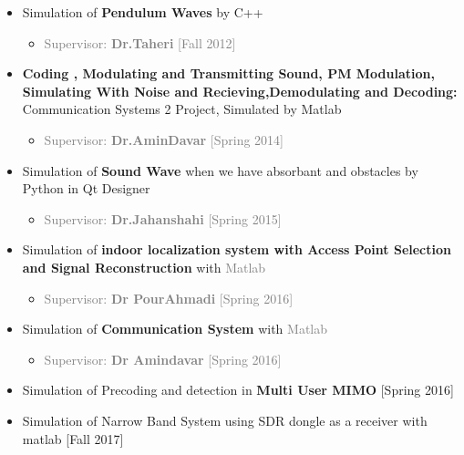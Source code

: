 \documentclass[10pt,a4paper,sans]{moderncv} %
\begin{document}
\begin{itemize}
\item Simulation of \textbf{Pendulum Waves} by C++
\begin{itemize}
\item \textcolor{gray}{Supervisor: \textbf{Dr.Taheri} [Fall 2012]}
\end{itemize}

\item \textbf{Coding , Modulating and Transmitting Sound, PM Modulation, Simulating With Noise and Recieving,Demodulating and Decoding:} Communication Systems 2 Project, Simulated by Matlab 
\begin{itemize}
\item \textcolor{gray}{Supervisor: \textbf{Dr.AminDavar} [Spring 2014]}
\end{itemize}

\item Simulation of \textbf{Sound Wave} when we have absorbant and obstacles by Python in Qt Designer
\begin{itemize}
\item \textcolor{gray}{Supervisor: \textbf{Dr.Jahanshahi} [Spring 2015]}
\end{itemize}
\item Simulation of \textbf{ indoor localization system with Access Point Selection and Signal Reconstruction} with \textcolor{gray}{Matlab}
\begin{itemize}
\item \textcolor{gray}{Supervisor: \textbf{Dr PourAhmadi} [Spring 2016]}
\end{itemize}
\item Simulation of  \textbf{Communication System} with \textcolor{gray}{Matlab}
\begin{itemize}
\item \textcolor{gray}{Supervisor: \textbf{Dr Amindavar} [Spring 2016]}
\end{itemize}
\item Simulation of Precoding and detection in   \textbf{Multi User MIMO}  [Spring 2016]
\item Simulation of Narrow Band System using SDR dongle as a receiver with matlab  [Fall 2017]
\end{itemize}

\end{document}
